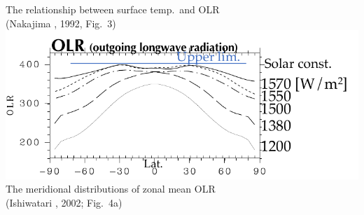 \documentclass[aspectratio=149,9pt,fleqn,tbtags]{beamer}
\begin{document}
\begin{frame}
\begin{columns}[T]
\begin{column}{.35\textwidth}
			The relationship between surface temp.~and OLR\\
			(Nakajima \etal*, 1992, Fig.~3)
			\includegraphics[width=\textwidth]{fig-i2002-olr.pdf}
			The meridional distributions of zonal mean OLR\\
			(Ishiwatari \etal*, 2002; Fig.~4a)
		\end{column}
	\end{columns}
\end{frame}
\end{document}
